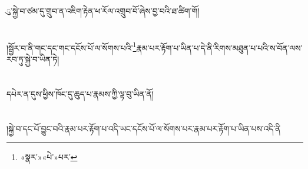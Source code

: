 ུ་སྐྱེ་བ་ཙམ་དུ་གྲུབ་ན་འཇིག་རྟེན་ཕ་རོལ་འགྲུབ་བོ་ཞེས་བྱ་བའི་ཐ་ཚིག་གོ།\chapter{ }།སྦྱོར་བ་ནི་གང་དང་གང་དངོས་པོ་ལ་སོགས་པའི་\footnote{«སྣར་»«པེ་»པར་}རྣམ་པར་རྟོག་པ་ཡིན་པ་དེ་ནི་རིགས་མཐུན་པ་པའི་ས་བོན་ལས་རབ་ཏུ་སྐྱེ་བ་ཡིན་ཏེ།\chapter{ }དཔེར་ན་དུས་ཕྱིས་ཁོང་དུ་ཆུད་པ་རྣམས་ཀྱི་ལྟ་བུ་ཡིན་ནོ།\chapter{ }།སྐྱེ་བ་དང་པོ་བྱུང་བའི་རྣམ་པར་རྟོག་པ་འདི་ཡང་དངོས་པོ་ལ་སོགས་པར་རྣམ་པར་རྟོག་པ་ཡིན་པས་འདི་ནི